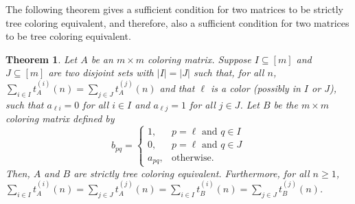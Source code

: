\documentclass[12pt]{amsart}
\newtheorem{theorem}{Theorem}
\begin{document}
The following theorem gives a sufficient condition for two matrices to be strictly tree coloring equivalent, and therefore, also a sufficient condition for two matrices to be tree coloring equivalent.
\begin{theorem}\label{prop:EqivColsStrict}
    Let $A$ be an $m\times m$ coloring matrix. Suppose $I\subseteq[m]$ and $J\subseteq[m]$ are two disjoint sets with $|I|=|J|$ such that, for all $n$, $\sum_{i\in I}t_A^{(i)}(n)=\sum_{j\in J}t_A^{(j)}(n)$ and that $\ell$ is a color (possibly in $I$ or $J$), such that $a_{\ell i} = 0$ for all $i\in I$ and $a_{\ell j} = 1$ for all $j\in J$. 
    Let $B$ be the $m\times m$ coloring matrix defined by
    \[
    b_{pq}=\begin{cases}
        1,&\text{$p=\ell$ and $q\in I$}\\
        0,&\text{$p=\ell$ and $q\in J$}\\
        a_{pq},&\text{otherwise}.
    \end{cases}
    \]
    Then, $A$ and $B$ are strictly tree coloring equivalent.
    Furthermore, for all $n\geq1$,
    $\sum_{i\in I}t^{(i)}_A(n)=\sum_{j\in J}t^{(j)}_A(n)=\sum_{i\in I}t^{(i)}_{B}(n)=\sum_{j\in J}t^{(j)}_{B}(n)$.
\end{theorem}
\end{document}
